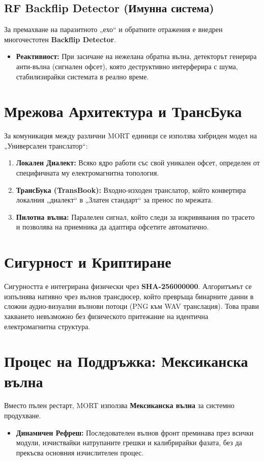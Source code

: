 \documentclass[11pt,a4paper]{article}
\begin{document}
\subsection{RF Backflip Detector (Имунна система)}
За премахване на паразитното „ехо“ и обратните отражения е внедрен многочестотен \textbf{Backflip Detector}.
\begin{itemize}
    \item \textbf{Реактивност:} При засичане на нежелана обратна вълна, детекторът генерира анти-вълна (сигнален офсет), която деструктивно интерферира с шума, стабилизирайки системата в реално време.
\end{itemize}

\section{Мрежова Архитектура и ТрансБука}
За комуникация между различни MORT единици се използва хибриден модел на „Универсален транслатор“:
\begin{enumerate}
    \item \textbf{Локален Диалект:} Всяко ядро работи със свой уникален офсет, определен от специфичната му електромагнитна топология.
    \item \textbf{ТрансБука (TransBook):} Входно-изходен транслатор, който конвертира локалния „диалект“ в „Златен стандарт“ за пренос по мрежата.
    \item \textbf{Пилотна вълна:} Паралелен сигнал, който следи за изкривявания по трасето и позволява на приемника да адаптира офсетите автоматично.
\end{enumerate}

\section{Сигурност и Криптиране}
Сигурността е интегрирана физически чрез \textbf{SHA-256000000}. Алгоритъмът се изпълнява нативно чрез вълнов трансдюсер, който превръща бинарните данни в сложни аудио-визуални вълнови потоци (PNG към WAV транслация). Това прави хакването невъзможно без физическото притежание на идентична електромагнитна структура.

\section{Процес на Поддръжка: Мексиканска вълна}
Вместо пълен рестарт, MORT използва \textbf{Мексиканска вълна} за системно продухване.
\begin{itemize}
    \item \textbf{Динамичен Рефреш:} Последователен вълнов фронт преминава през всички модули, изчиствайки натрупаните грешки и калибрирайки фазата, без да прекъсва основния изчислителен процес.
\end{itemize}
\end{document}
